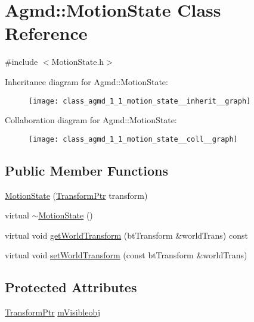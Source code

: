 \hypertarget{class_agmd_1_1_motion_state}{\section{Agmd\+:\+:Motion\+State Class Reference}
\label{class_agmd_1_1_motion_state}
}


{\ttfamily \#include $<$Motion\+State.\+h$>$}



Inheritance diagram for Agmd\+:\+:Motion\+State\+:\nopagebreak
\begin{figure}[H]
\begin{center}
\leavevmode
\texttt{[image: class\_agmd\_1\_1\_motion\_state\_\_inherit\_\_graph]}
\end{center}
\end{figure}


Collaboration diagram for Agmd\+:\+:Motion\+State\+:\nopagebreak
\begin{figure}[H]
\begin{center}
\leavevmode
\texttt{[image: class\_agmd\_1\_1\_motion\_state\_\_coll\_\_graph]}
\end{center}
\end{figure}
\subsection*{Public Member Functions}
\begin{DoxyCompactItemize}
\item 
\hyperlink{class_agmd_1_1_motion_state_a8b067656f26e649636415a3ad21b1e76}{Motion\+State} (\hyperlink{namespace_agmd_maths_a5f0367fe1d910e5b7bf2f4b657f33aff}{Transform\+Ptr} transform)
\item 
virtual \hyperlink{class_agmd_1_1_motion_state_a50afd3b1e0e1b131b40b98c9764ceea2}{$\sim$\+Motion\+State} ()
\item 
virtual void \hyperlink{class_agmd_1_1_motion_state_abdf5479ae41c0c9e732a16636209b8f2}{get\+World\+Transform} (bt\+Transform \&world\+Trans) const 
\item 
virtual void \hyperlink{class_agmd_1_1_motion_state_a605ea9f313e620892eda9719ed0562d3}{set\+World\+Transform} (const bt\+Transform \&world\+Trans)
\end{DoxyCompactItemize}
\subsection*{Protected Attributes}
\begin{DoxyCompactItemize}
\item 
\hyperlink{namespace_agmd_maths_a5f0367fe1d910e5b7bf2f4b657f33aff}{Transform\+Ptr} \hyperlink{class_agmd_1_1_motion_state_aafba23c4907296b7f23a45c93d452665}{m\+Visibleobj}
\end{DoxyCompactItemize}



